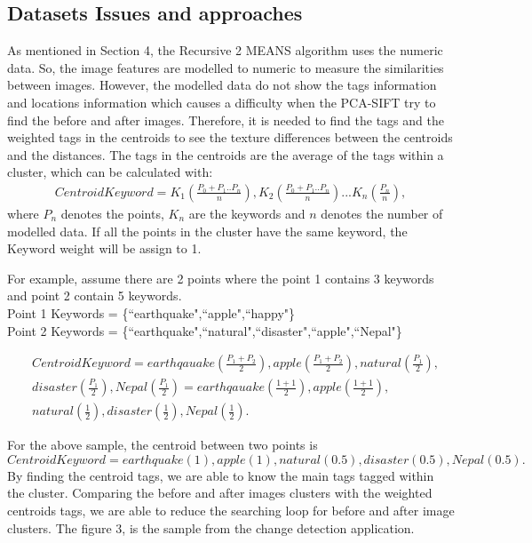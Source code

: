 \documentclass[runningheads,a4paper]{llncs}
\newcommand{\yongli}{\todo[author=YL,color=green,inline]}
\newcommand{\eat}[1]{}
\begin{document}
{\subsection{Datasets Issues and approaches}

As mentioned in Section 4,
the Recursive 2 MEANS algorithm uses the numeric data. So, the image features are modelled to numeric to measure the similarities between images.
However, the modelled data do not show the tags information and locations information
which causes a difficulty when the PCA-SIFT try to find the before and after images.
Therefore, it is needed to find the tags and the weighted tags in the centroids to see the texture differences between the centroids and the distances.
The tags in the centroids are the average of the tags within a cluster, which can be calculated with:
\begin{eqnarray}
CentroidKeyword = K_1(\frac{P_0+P_1..P_n}{n}),K_2(\frac{P_0+P_1..P_n}{n}) ...K_n(\frac{P_n}{n}),
\end{eqnarray}
where $P_n$ denotes the points, $K_n$ are the keywords and $n$ denotes the number of modelled data. If all the points in the cluster have the same keyword, the Keyword weight will be assign to 1.
\eat{\yongli{what does 'the data' refer to?}}
For example, assume there are 2 points where the point 1 contains 3 keywords and point 2 contain 5 keywords.\\
Point 1 Keywords = \{``earthquake",``apple",``happy"\}\\
Point 2 Keywords = \{``earthquake",``natural",``disaster",``apple",``Nepal"\}

\begin{eqnarray}\label{eq:pareto mle2}
&CentroidKeyword = earthqauake(\frac{P_1+P_2}{2}), apple(\frac{P_1+P_2}{2}),natural(\frac{P_1}{2}), \nonumber\\ &disaster(\frac{P_1}{2}), Nepal(\frac{P_1}{2})= earthqauake(\frac{1+1}{2}), apple(\frac{1+1}{2}), \nonumber\\
&natural(\frac{1}{2}),disaster(\frac{1}{2}),Nepal(\frac{1}{2}) .
\end{eqnarray}
\eat{\yongli{This equation is confusing. what is $V$?}}
For the above sample, the centroid between two points is
\begin{displaymath}
CentroidKeyword = earthquake(1), apple(1), natural(0.5), disaster(0.5), Nepal(0.5).
\end{displaymath}
 By finding the centroid tags, we are able to know the main tags tagged within the cluster.
Comparing the before and after images clusters with the weighted centroids tags, we are able to reduce the searching loop for before and after image clusters.
The figure 3, is the sample from the change detection application.


}
\end{document}
